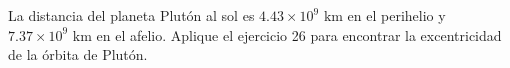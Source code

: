 \item La distancia del planeta Plutón al sol es $4.43 \times 10^9 \text{ km}$ en el perihelio y $7.37 \times 10^9 \text{ km}$ en el afelio. Aplique el ejercicio 26 para encontrar la excentricidad de la órbita de Plutón.
